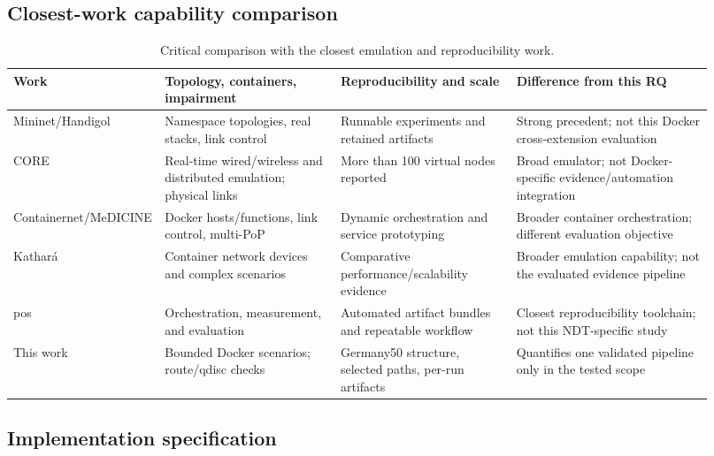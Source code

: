 

\FloatBarrier

\subsection{Closest-work capability comparison}

\begin{table}[h]
\caption{Critical comparison with the closest emulation and reproducibility work.}
\label{tab:closest-work}
\centering
\setlength{\tabcolsep}{1pt}
\begin{tabular}{p{0.14\linewidth}p{0.25\linewidth}p{0.25\linewidth}p{0.28\linewidth}}
\hline
Work & Topology, containers, impairment & Reproducibility and scale & Difference from this RQ \\
\hline
Mininet/\newline Handigol & Namespace topologies, real stacks, link control & Runnable experiments and retained artifacts & Strong precedent; not this Docker cross-extension evaluation \\
CORE & Real-time wired/wireless and distributed emulation; physical links & More than 100 virtual nodes reported & Broad emulator; not Docker-specific evidence/automation integration \\
Containernet/\newline MeDICINE & Docker hosts/functions, link control, multi-PoP & Dynamic orchestration and service prototyping & Broader container orchestration; different evaluation objective \\
Kathar\'a & Container network devices and complex scenarios & Comparative performance/scalability evidence & Broader emulation capability; not the evaluated evidence pipeline \\
pos & Orchestration, measurement, and evaluation & Automated artifact bundles and repeatable workflow & Closest reproducibility toolchain; not this NDT-specific study \\
This work & Bounded Docker scenarios; route/qdisc checks & Germany50 structure, selected paths, per-run artifacts & Quantifies one validated pipeline only in the tested scope \\
\hline
\end{tabular}
\end{table}

\FloatBarrier

\subsection{Implementation specification}
\label{sec:implementation-specification}

